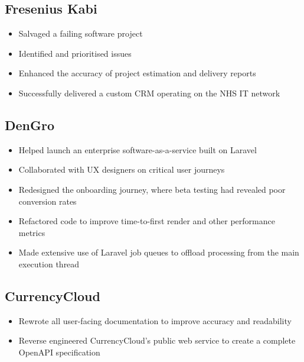 \documentclass[a4paper,10pt]{article}
\begin{document}
\subsection*{Fresenius Kabi \hfill {}}
\begin{itemize}
  \item Salvaged a failing software project
  \item Identified and prioritised issues
  \item Enhanced the accuracy of project estimation and delivery reports
  \item Successfully delivered a custom CRM operating on the NHS IT network
\end{itemize}

\subsection*{DenGro \hfill {}}
\begin{itemize}
  \item Helped launch an enterprise software-as-a-service built on Laravel
  \item Collaborated with UX designers on critical user journeys
  \item Redesigned the onboarding journey, where beta testing had revealed poor conversion rates
  \item Refactored code to improve time-to-first render and other performance metrics
  \item Made extensive use of Laravel job queues to offload processing from the main execution thread
\end{itemize}

\subsection*{CurrencyCloud \hfill {}}
\begin{itemize}
  \item Rewrote all user-facing documentation to improve accuracy and readability
  \item Reverse engineered CurrencyCloud's public web service to create a complete OpenAPI specification
\end{itemize}
\end{document}

